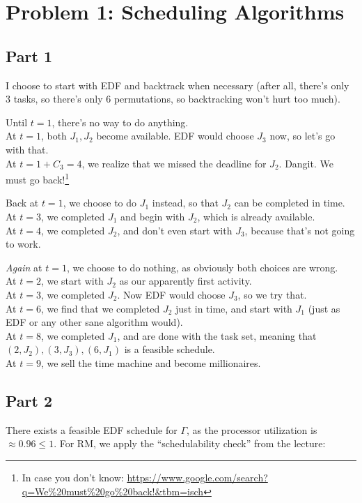 \documentclass[a4paper,parskip,headheight=38pt]{scrartcl} %
\begin{document}
\section*{Problem 1: Scheduling Algorithms}

\subsection*{Part 1}

I choose to start with EDF and backtrack when necessary (after all,
there's only 3 tasks, so there's only 6 permutations, so backtracking
won't hurt too much).

Until $t=1$, there's no way to do anything.
 \\
At $t=1$, both $J_1, J_2$ become available.  EDF would choose $J_3$
now, so let's go with that.
 \\
At $t=1+C_3=4$, we realize that we missed the deadline for $J_2$.
Dangit.  We must go back!\footnote{In case you don't know:
\url{https://www.google.com/search?q=We\%20must\%20go\%20back!&tbm=isch}}

Back at $t=1$, we choose to do $J_1$ instead, so that $J_2$
can be completed in time.
 \\
At $t=3$, we completed $J_1$ and begin with $J_2$, which is already
available.
 \\
At $t=4$, we completed $J_2$, and don't even start with $J_3$, because
that's not going to work.

\emph{Again} at $t=1$, we choose to do nothing, as obviously both
choices are wrong.
 \\
At $t=2$, we start with $J_2$ as our apparently first activity.
 \\
At $t=3$, we completed $J_2$.  Now EDF would choose $J_3$, so we try
that.
 \\
At $t=6$, we find that we completed $J_2$ just in time, and start with
$J_1$ (just as EDF or any other sane algorithm would).
 \\
At $t=8$, we completed $J_1$, and are done with the task set, meaning
that $(2, J_2), (3, J_3), (6, J_1)$ is a feasible schedule.
 \\
At $t=9$, we sell the time machine and become millionaires.

\subsection*{Part 2}

There exists a feasible EDF schedule for $\Gamma$, as the processor
utilization is $\approx 0.96 \leq 1$.  For RM, we apply the
\enquote{schedulability check} from the lecture:
\end{document}
